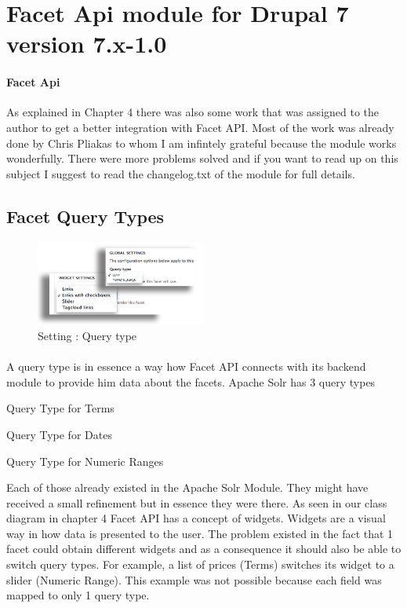 \section{Facet Api module for Drupal 7 version 7.x-1.0}
\paragraph{Facet Api} As explained in Chapter 4 there was also some work that was assigned to the author to get a better integration with Facet API. Most of the work was already done by Chris Pliakas to whom I am infintely grateful because the module works wonderfully. There were more problems solved and if you want to read up on this subject I suggest to read the changelog.txt of the module for full details.

\subsection{Facet Query Types}
\begin{figure}
\begin{center}
     \includegraphics[width=0.5\textwidth]{images/implementation/facet_query_type_and_widget.png}
     \caption{Setting : Query type}
\end{center}
\end{figure}
\paragraph{}
A query type is in essence a way how Facet API connects with its backend module to provide him data about the facets. Apache Solr has 3 query types
\begin{packed_itemize}
\item Query Type for Terms
\item Query Type for Dates
\item Query Type for Numeric Ranges
\end{packed_itemize}

Each of those already existed in the Apache Solr Module. They might have received a small refinement but in essence they were there. As seen in our class diagram in chapter 4 Facet API has a concept of widgets. Widgets are a visual way in how data is presented to the user. 
The problem existed in the fact that 1 facet could obtain different widgets and as a consequence it should also be able to switch query types. For example, a list of prices (Terms) switches its widget to a slider (Numeric Range). This example was not possible because each field was mapped to only 1 query type.

